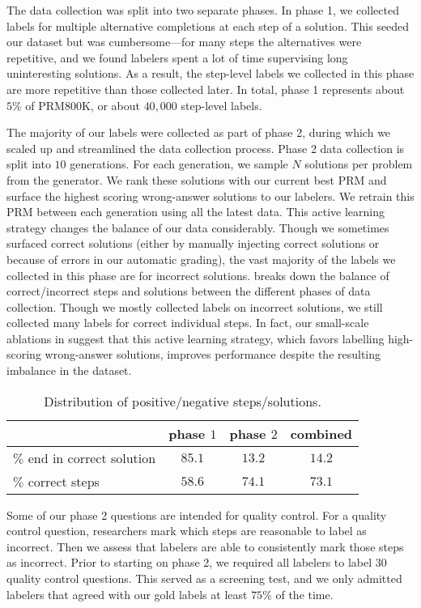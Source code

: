 \documentclass{article}
\begin{document}
The data collection was split into two separate phases. In phase 1, we collected labels for multiple alternative completions at each step of a solution. This seeded our dataset but was cumbersome---for many steps the alternatives were repetitive, and we found labelers spent a lot of time supervising long uninteresting solutions. As a result, the step-level labels we collected in this phase are more repetitive than those collected later. In total, phase 1 represents about $5\%$ of PRM800K, or about $40,\!000$ step-level labels.

The majority of our labels were collected as part of phase 2, during which we scaled up and streamlined the data collection process. Phase 2 data collection is split into $10$ generations. For each generation, we sample $N$ solutions per problem from the generator. We rank these solutions with our current best PRM and surface the highest scoring wrong-answer solutions to our labelers. We retrain this PRM between each generation using all the latest data. This active learning strategy changes the balance of our data considerably. Though we sometimes surfaced correct solutions (either by manually injecting correct solutions or because of errors in our automatic grading), the vast majority of the labels we collected in this phase are for incorrect solutions.  breaks down the balance of correct/incorrect steps and solutions between the different phases of data collection. Though we mostly collected labels on incorrect solutions, we still collected many labels for correct individual steps. In fact, our small-scale ablations in  suggest that this active learning strategy, which favors labelling high-scoring wrong-answer solutions, improves performance despite the resulting imbalance in the dataset.

\begin{table}[!h]
\centering
\begin{tabular}{l*{3}{c}} 
 \hline
  & phase $1$ & phase $2$ & combined \\ 
 \hline
 $\%$ end in correct solution & $85.1$ & $13.2$ & $14.2$ \\ 
 $\%$ correct steps & $58.6$ & $74.1$ & $73.1$ \\ 
 \hline
\end{tabular}
\caption{Distribution of positive/negative steps/solutions.}
\label{table:balance}
\end{table}

Some of our phase 2 questions are intended for quality control. For a quality control question, researchers mark which steps are reasonable to label as incorrect. Then we assess that labelers are able to consistently mark those steps as incorrect. Prior to starting on phase 2, we required all labelers to label 30 quality control questions. This served as a screening test, and we only admitted labelers that agreed with our gold labels at least $75\%$ of the time.
\end{document}

